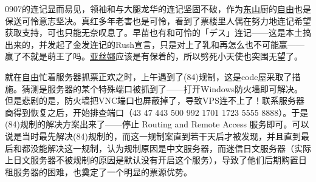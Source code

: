 
0907的连记显而易见，领袖和与大腿龙华的连记坚固不破，作为\uline{东山}厨的\uline{自由}也是保送可怜意志坚决。真红多年老害也是可怜，看到了票楼里人偶在努力地连记希望获取支持，可也只能无奈叹息了。早苗也有和可怜的「デス」连记——这是本土搞出来的，并发起了金发连记的Rush宣言，只是对上了乳和再怎么也不可能赢——赢了不就是萌王了吗。\uline{亚丝娜}应该是有保着的，所以劈死小天使也突围无望了。

就在\uline{自由}忙着服务器抓票正欢之时，上午遇到了(84)规制，这是code屋采取了措施。猜测是服务器的某个特殊端口被抓到了——打开Windows防火墙即可解决。但是悲剧的是，防火墙把VNC端口也屏蔽掉了，导致VPS连不上了！联系服务器商得到恢复之后，开始排查端口（43 47 443 500 992 1701 1723 5555 8888）。于是(84)规制的解决方案出来了——停止 Routing and Remote Access 服务即可。可以说是当时最先解决(84)规制的，而这一规制案直到若干天后才被发现，并且直到最后和都没能解决这一规制，认为规制原因是中文服务器，而迷信日文服务器（实际上日文服务器不被规制的原因是默认没有开启这个服务），导致了他们后期购置日租服务器的困难，也奠定了一个明显的票源优势。

